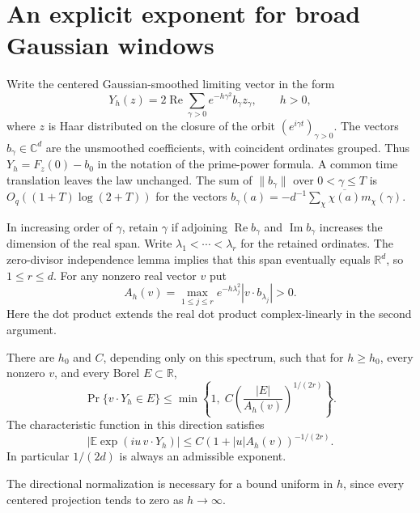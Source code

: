\section{An explicit exponent for broad Gaussian windows}
\label{sec:broad}
Write the centered Gaussian-smoothed limiting vector in the form
\[
   Y_h(z)=2\operatorname{Re}\sum_{\gamma>0}
                   e^{-h\gamma^2} b_\gamma z_\gamma ,
       \qquad h>0,
\]
where $z$ is Haar distributed on the closure of the orbit
$(e^{i\gamma t})_{\gamma>0}$. The vectors $b_\gamma\in\mathbb C^d$
are the unsmoothed coefficients, with coincident ordinates grouped.
Thus $Y_h=F_z(0)-b_0$ in the notation of the prime-power formula.
A common time translation leaves the law unchanged. The sum of
$\|b_\gamma\|$ over $0<\gamma\le T$ is $O_q((1+T)\log(2+T))$ for
the vectors $b_\gamma(a)=-d^{-1}\sum_\chi
\overline{\chi(a)}m_\chi(\gamma)$.

In increasing order of $\gamma$, retain $\gamma$ if adjoining
$\operatorname{Re}b_\gamma$ and $\operatorname{Im}b_\gamma$ increases
the dimension of the real span. Write $\lambda_1<\cdots<\lambda_r$
for the retained ordinates. The zero-divisor independence lemma implies
that this span eventually equals $\mathbb R^d$, so $1\le r\le d$.
For any nonzero real vector $v$ put
\[
 A_h(v)=\max_{1\le j\le r}e^{-h\lambda_j^2}
                         |v\cdot b_{\lambda_j}|>0 .
\]
Here the dot product extends the real dot product complex-linearly in
the second argument.

\begin{theorem}\label{thm:broad}
There are $h_0$ and $C$, depending only on this spectrum, such that
for $h\ge h_0$, every nonzero $v$, and every Borel $E\subset\mathbb R$,
\[
  \Pr\{v\cdot Y_h\in E\}
    \le \min\left\{1,\;C\left(\frac{|E|}{A_h(v)}\right)^{1/(2r)}\right\}.
\]
The characteristic function in this direction satisfies
\[
 \left|\mathbb E\exp(iu\,v\cdot Y_h)\right|
       \le C(1+|u|A_h(v))^{-1/(2r)} .
\]
In particular $1/(2d)$ is always an admissible exponent.
\end{theorem}

The directional normalization is necessary for a bound uniform in $h$,
since every centered projection tends to zero as $h\to\infty$.

